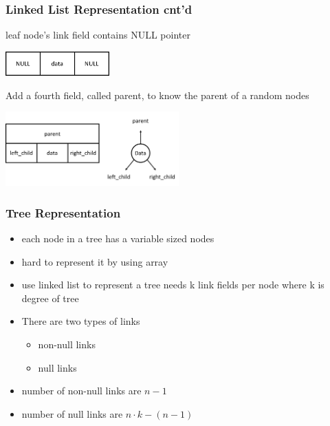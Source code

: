 \documentclass[newPxFont,sthlmFooter,nooffset]{beamer}
\begin{document}
\begin{frame}[t]
  \frametitle{Linked List Representation cnt'd}
leaf node's link field contains NULL pointer

  \begin{center}
\vspace{-1em}
    \includegraphics[width=0.3\textwidth]{figures/fig08_linked_list2.png}
  \end{center}

Add a fourth field, called parent, to know the parent of a random nodes
  \begin{center}
\vspace{-1em}
    \includegraphics[width=0.5\textwidth]{figures/fig08_linked_list1.png}
  \end{center}

\end{frame}



\begin{frame}[t]
  \frametitle{Tree Representation}
  \begin{itemize}
  \item each node in a tree has a variable sized nodes
  \item hard to represent it by using array
  \item use linked list to represent a tree needs k link fields per node where k is degree of tree
  \item There are two types of links
    \begin{itemize}
    \item non-null links
    \item null links
    \end{itemize}
  \item number of non-null links are $n-1$
  \item number of null links are $n \cdot k - (n-1)$
  \end{itemize}
\end{frame}
\end{document}
